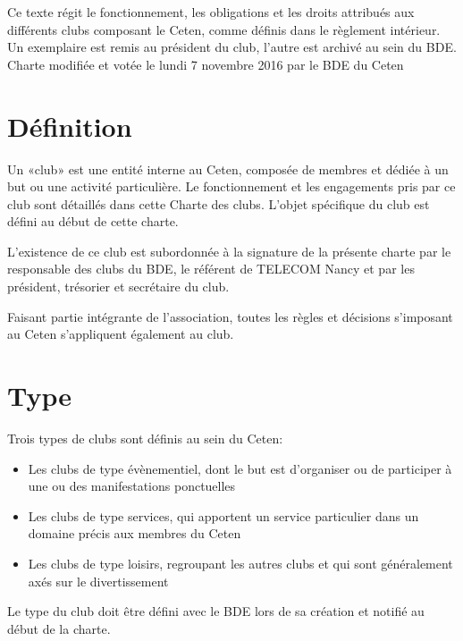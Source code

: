 \documentclass{article}
\begin{document}
\begin{titlepage}
		\vfill
		\begin{center}
			{\footnotesize \light{} Ce texte régit le fonctionnement, les
			obligations et les droits attribués aux différents clubs composant
			le Ceten, comme définis dans le règlement intérieur. Un exemplaire
			est remis au président du club, l’autre est archivé au sein du
			BDE\@.\\
			Charte modifiée et votée le lundi 7 novembre 2016 par le BDE du
			Ceten}
		\end{center}
	\end{titlepage}



	\begin{multicols}{2}
		
		\section{Définition}
\label{sec:definition}
			
		{\small
			
			Un «club» est une entité interne au Ceten, composée de membres et
			dédiée à un but ou une activité particulière. Le fonctionnement et
			les engagements pris par ce club sont détaillés dans cette Charte
			des clubs. L’objet spécifique du club est défini au début de cette
			charte.

			L'existence de ce club est subordonnée à la signature de la présente
			charte par le responsable des clubs du BDE, le référent de TELECOM
			Nancy et par les président, trésorier et secrétaire du club.

			Faisant partie intégrante de l’association, toutes les règles et
			décisions s’imposant au Ceten s’appliquent également au club.
			
		}

		\section{Type}
\label{sec:type}
			
		{\small
		
			Trois types de clubs sont définis au sein du Ceten:
			\begin{itemize}
				\item Les clubs de type évènementiel, dont le but est
					d’organiser ou de participer à une ou des manifestations
					ponctuelles
				\item Les clubs de type services, qui apportent un service
					particulier dans un domaine précis aux membres du Ceten
				\item Les clubs de type loisirs, regroupant les autres clubs et
					qui sont généralement axés sur le divertissement
			\end{itemize}
			Le type du club doit être défini avec le BDE lors de sa création et
			notifié au début de la charte.
			
}
\end{multicols}
\end{document}
